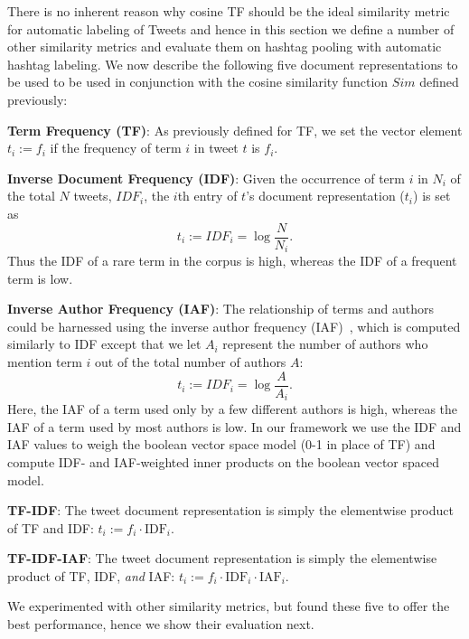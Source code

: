 \documentclass[10pt,a5paper,twoside]{article}
\begin{document}
There is no inherent reason why cosine TF should be the ideal
similarity metric for automatic labeling of Tweets and hence in this
section we define a number of other similarity metrics and 
evaluate them on hashtag pooling with automatic hashtag labeling.
We now describe the following five document representations to be used to
be used in conjunction with the cosine similarity function $\mathit{Sim}$
defined previously:
\begin{description}
\item{\bf Term Frequency (TF)}: As previously defined for TF, we set the vector element $t_i := f_i$ if the frequency of term $i$ in tweet $t$ is $f_i$.
\item{\bf Inverse Document Frequency (IDF)}:  Given the occurrence of term $i$ in $N_i$ of the total $N$ tweets, $\mathit{IDF}_i$, the $i$th entry of $t$'s document representation ($t_i$) is set as
\begin{equation*}
t_i := \mathit{IDF}_i = \log{\frac{N}{N_i}}.
\end{equation*}
Thus the IDF of a rare term in the corpus is high, whereas the IDF of a frequent term is low. 
\item{\bf Inverse Author Frequency (IAF)}: The relationship of terms and authors could be harnessed using the inverse author frequency (IAF)~\cite{iaf}, which is computed similarly to IDF except that we let $A_i$ represent the number of authors who mention term $i$ out of the total number of authors $A$:
\begin{equation*}
t_i := \mathit{IDF}_i = \log{\frac{A}{A_i}}.
\end{equation*}
Here, the IAF of a term used only by a few different authors is high, whereas the IAF of a term used by most authors is low. In our framework we use the IDF and IAF values to weigh the boolean vector space model (0-1 in place of TF) and compute IDF- and IAF-weighted inner products on the boolean vector spaced model.
\item{\bf TF-IDF}: The tweet document representation is simply the elementwise product of TF and IDF: $t_i := f_i \cdot \mathrm{IDF}_i$.
\item{\bf TF-IDF-IAF}: The tweet document representation is simply the elementwise product of TF, IDF, \emph{and} IAF: $t_i := f_i \cdot \mathrm{IDF}_i \cdot \mathrm{IAF}_i$.
\end{description}
We experimented with other similarity metrics, but found these five to
offer the best performance, hence we show their evaluation next.
\end{document}
